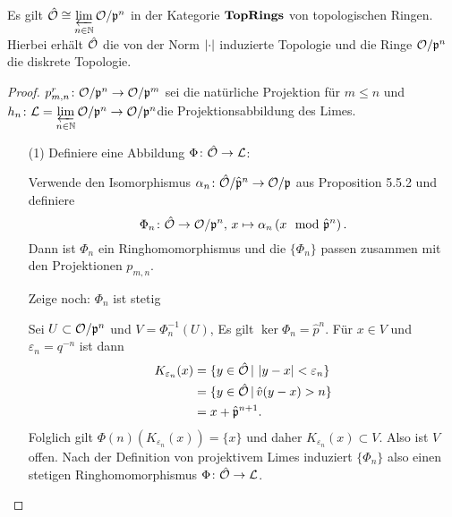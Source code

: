 \begin{Prop}
Es gilt $ \hat{\mathcal{O}} \cong \varprojlim\limits_{n\in\mathbb{N}} \mathcal{O} / \mathfrak{p}^n$ in der Kategorie $\textbf{\text{{TopRings}}}$ von topologischen Ringen. Hierbei erhält $\hat{\mathcal{O}}$ die von der Norm $\left|{\cdot}\right|$ induzierte Topologie und die Ringe $\mathcal{O} / \mathfrak{p}^n$ die diskrete Topologie.
\end{Prop}


\begin{proof}
$p^r_{m,n} \colon \mathcal{O} / \mathfrak{p}^n \rightarrow \mathcal{O}/ \mathfrak{p}^m$ sei die natürliche Projektion für $m\leq n$
und $h_n \colon \mathcal{L} = \varprojlim\limits_{n\in\mathbb{N}} \mathcal{O}/\mathfrak{p}^n \to \mathcal{O}/\mathfrak{p}^n$die Projektionsabbildung des Limes.
\begin{itemize} 
\item[(1)] Definiere eine Abbildung $\Phi \colon \hat{\mathcal{O}} \to\mathcal{L}$:

Verwende den Isomorphismus $\alpha_n \colon \hat{\mathcal{O}}/ \hat{\mathfrak{p}}^n \to \mathcal{O} / \mathfrak{p}$ aus Proposition 5.5.2 und definiere 
\[ \Phi_n \colon \hat{\mathcal{O}} \to \mathcal{O} / \mathfrak{p}^n, \, x \mapsto \alpha_n \left(  x \mod \hat{\mathfrak{p}}^n \right).
\]
Dann ist $\Phi_n$ ein Ringhomomorphismus und die $\{ \Phi_n \}$ passen zusammen mit den Projektionen $p_{m,n}$.

\bigskip Zeige noch: $\Phi_n$ ist stetig

Sei $U \subset \mathcal{O}/\mathfrak{p}^n$ und $V=\Phi_n^{-1}(U)$, Es gilt $\ker \Phi_n = \hat{p}^n$. Für $x\in V$ und $\varepsilon_n = q^{-n}$ ist dann
\begin{align*}
K_{\varepsilon_n}(x) 
&= \{ y \in \hat{\mathcal{O}} \,|\, \left|{y-x}\right|< \varepsilon_n  \} \\
&= \{ y \in \hat{\mathcal{O}} \,|\, \hat{v}(y-x) > n  \} \\
&= x+ \hat{\mathfrak{p}}^{n+1}.
\end{align*}
Folglich gilt $\Phi(n)( K_{\varepsilon_n}(x)  ) = \{x\}$ und daher $K_{\varepsilon_n}(x)  \subset V$. Also ist $V$ offen.
Nach der Definition von projektivem Limes induziert $\{\Phi_n \}$ also einen stetigen Ringhomomorphismus  $\Phi \colon \hat{\mathcal{O}} \to\mathcal{L}$.
\end{itemize}
\end{proof}







